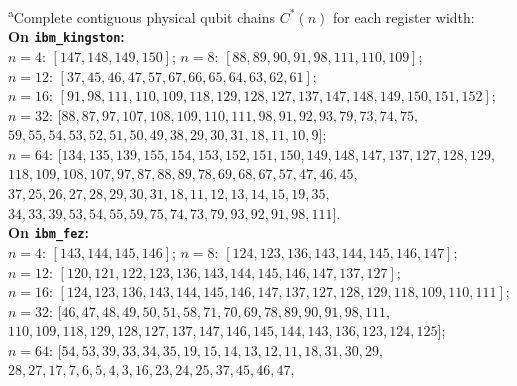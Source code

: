 \documentclass[aps,pra,reprint,superscriptaddress,floatfix,nofootinbib]{revtex4-2}
\begin{document}
\begin{table}[t]
\vspace{4pt}
{\raggedright \footnotesize \textsuperscript{a}Complete contiguous physical qubit chains $C^*(n)$ for each register width:\\
\textbf{On \texttt{ibm\_kingston}:}\\
$n = 4$: $[147, 148, 149, 150]$; \quad $n = 8$: $[88, 89, 90, 91, 98, 111, 110, 109]$;\\
$n = 12$: $[37, 45, 46, 47, 57, 67, 66, 65, 64, 63, 62, 61]$;\\
$n = 16$: $[91, 98, 111, 110, 109, 118, 129, 128, 127, 137, 147, 148, 149, 150, 151, 152]$;\\
$n = 32$: $[88, 87, 97, 107, 108, 109, 110, 111, 98, 91, 92, 93, 79, 73, 74, 75,$\\
\hspace*{3.2em}$59, 55, 54, 53, 52, 51, 50, 49, 38, 29, 30, 31, 18, 11, 10, 9]$;\\
$n = 64$: $[134, 135, 139, 155, 154, 153, 152, 151, 150, 149, 148, 147, 137, 127, 128, 129,$\\
\hspace*{3.2em}$118, 109, 108, 107, 97, 87, 88, 89, 78, 69, 68, 67, 57, 47, 46, 45,$\\
\hspace*{3.2em}$37, 25, 26, 27, 28, 29, 30, 31, 18, 11, 12, 13, 14, 15, 19, 35,$\\
\hspace*{3.2em}$34, 33, 39, 53, 54, 55, 59, 75, 74, 73, 79, 93, 92, 91, 98, 111]$.\\[2pt]
\textbf{On \texttt{ibm\_fez}:}\\
$n = 4$: $[143, 144, 145, 146]$; \quad $n = 8$: $[124, 123, 136, 143, 144, 145, 146, 147]$;\\
$n = 12$: $[120, 121, 122, 123, 136, 143, 144, 145, 146, 147, 137, 127]$;\\
$n = 16$: $[124, 123, 136, 143, 144, 145, 146, 147, 137, 127, 128, 129, 118, 109, 110, 111]$;\\
$n = 32$: $[46, 47, 48, 49, 50, 51, 58, 71, 70, 69, 78, 89, 90, 91, 98, 111,$\\
\hspace*{3.2em}$110, 109, 118, 129, 128, 127, 137, 147, 146, 145, 144, 143, 136, 123, 124, 125]$;\\
$n = 64$: $[54, 53, 39, 33, 34, 35, 19, 15, 14, 13, 12, 11, 18, 31, 30, 29,$\\
\hspace*{3.2em}$28, 27, 17, 7, 6, 5, 4, 3, 16, 23, 24, 25, 37, 45, 46, 47,$\\
}
\end{table}
\end{document}
